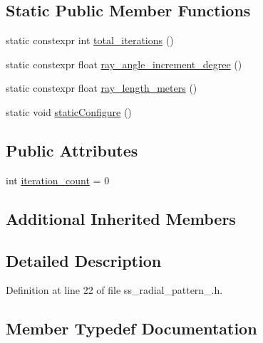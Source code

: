 \subsection*{Static Public Member Functions}
\begin{DoxyCompactItemize}
\item 
static constexpr int \hyperlink{structsm__dance__bot__3_1_1SS1_1_1SsRadialPattern1_af4870b0b2df001e0e43dc789f7a6f033}{total\+\_\+iterations} ()
\item 
static constexpr float \hyperlink{structsm__dance__bot__3_1_1SS1_1_1SsRadialPattern1_a19fe411682c3f4bdac7ca7963d6a2d1f}{ray\+\_\+angle\+\_\+increment\+\_\+degree} ()
\item 
static constexpr float \hyperlink{structsm__dance__bot__3_1_1SS1_1_1SsRadialPattern1_a96436c402a6540ad6c12c1846699ad2e}{ray\+\_\+length\+\_\+meters} ()
\item 
static void \hyperlink{structsm__dance__bot__3_1_1SS1_1_1SsRadialPattern1_ab419fa4fdd2501b33536409f0d85629c}{static\+Configure} ()
\end{DoxyCompactItemize}
\subsection*{Public Attributes}
\begin{DoxyCompactItemize}
\item 
int \hyperlink{structsm__dance__bot__3_1_1SS1_1_1SsRadialPattern1_a65f1fba9b7a18750484142c533514a70}{iteration\+\_\+count} = 0
\end{DoxyCompactItemize}
\subsection*{Additional Inherited Members}


\subsection{Detailed Description}


Definition at line 22 of file ss\+\_\+radial\+\_\+pattern\+\_.\+h.



\subsection{Member Typedef Documentation}

